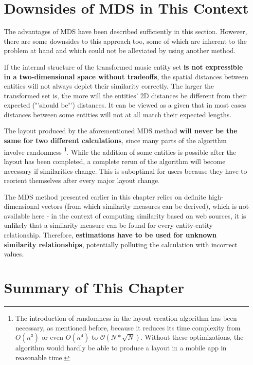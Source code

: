 \section{Downsides of MDS in This Context}

The advantages of MDS have been described sufficiently in this section. However, there are some downsides to this approach too, some of which are inherent to the problem at hand and which could not be alleviated by using another method.

If the internal structure of the transformed music entity set \textbf{is not expressible in a two-dimensional space without tradeoffs}, the spatial distances between entities will not always depict their similarity correctly. The larger the transformed set is, the more will the entities' 2D distances be different from their expected ("'should be"') distances. It can be viewed as a given that in most cases distances between some entities will not at all match their expected lengths.

The layout produced by the aforementioned MDS method \textbf{will never be the same for two different calculations}, since many parts of the algorithm involve randomness 
\footnote{The introduction of randomness in the layout creation algorithm has been necessary, as mentioned before, because it reduces its time complexity from $O(n^3)$ or even $O(n^4)$ to $\mathcal O(N*\sqrt{N})$. Without these optimizations, the algorithm would hardly be able to produce a layout in a mobile app in reasonable time.}.
While the addition of some entities is possible after the layout has been completed, a complete rerun of the algorithm will become necessary if similarities change. This is suboptimal for users because they have to reorient themselves after every major layout change.

The MDS method presented earlier in this chapter relies on definite high-dimensional vectors (from which similarity measures can be derived), which is not available here - in the context of computing similarity based on web sources, it is unlikely that a similarity measure can be found for every entity-entity relationship. Therefore, \textbf{estimations have to be used for unknown similarity relationships}, potentially polluting the calculation with incorrect values.

\section{Summary of This Chapter}

